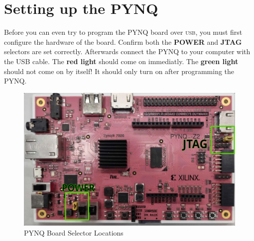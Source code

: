 \documentclass[12pt, a4paper, oneside]{memoir}
\begin{document}
\setlength{\beforechapskip}{-20pt}



\chapter*{Setting up the PYNQ}
Before you can even try to program the PYNQ board over \textsc{usb}, you must first configure the hardware of the board.
Confirm both the \textbf{POWER} and \textbf{JTAG} selectors are set correctly.
Afterwards connect the PYNQ to your computer with the USB cable. The \textbf{red light} should come on immediatly. The \textbf{green light} should not come on by itself! It should only turn on after programming the PYNQ.
\begin{figure}[H]
  \centering
  \includegraphics[width=\linewidth]{PYNQ_1_HIGH.png}
  \caption{PYNQ Board Selector Locations}
\end{figure}
\end{document}
